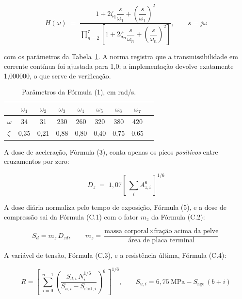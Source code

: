 \documentclass[11pt,a4paper]{article}
\begin{document}
\begin{equation}
H(\omega) \;=\;
\frac{1 + 2\zeta_1 \dfrac{s}{\omega_1} + \left(\dfrac{s}{\omega_1}\right)^2}
     {\displaystyle\prod_{n=2}^{7}
      \left[1 + 2\zeta_n \dfrac{s}{\omega_n} + \left(\dfrac{s}{\omega_n}\right)^2\right]},
\qquad s = j\omega
\label{eq:c5tf}
\end{equation}

\noindent
com os parâmetros da Tabela~\ref{tab:poles}. A norma registra que a
transmissibilidade em corrente contínua foi ajustada para 1,0; a implementação
devolve exatamente 1,000000, o que serve de verificação.

\begin{table}[h]
\centering
\caption{Parâmetros da Fórmula (1), em rad/s.}
\label{tab:poles}
\begin{tabular}{lcccccccc}
\toprule
 & $\omega_1$ & $\omega_2$ & $\omega_3$ & $\omega_4$ & $\omega_5$ & $\omega_6$ & $\omega_7$ \\
\midrule
$\omega$ & 34 & 31 & 230 & 260 & 320 & 380 & 420 \\
$\zeta$  & 0,35 & 0,21 & 0,88 & 0,80 & 0,40 & 0,75 & 0,65 \\
\bottomrule
\end{tabular}
\end{table}

A dose de aceleração, Fórmula (3), conta apenas os picos \emph{positivos} entre
cruzamentos por zero:

\begin{equation}
D_z \;=\; 1{,}07 \left[\ \sum_i A_{z,i}^{6}\ \right]^{1/6}
\label{eq:dz}
\end{equation}

A dose diária normaliza pelo tempo de exposição, Fórmula (5), e a dose de
compressão sai da Fórmula (C.1) com o fator $m_z$ da Fórmula (C.2):

\begin{equation}
S_d = m_z\,D_{zd},
\qquad
m_z = \frac{\text{massa corporal} \times \text{fração acima da pelve}}
           {\text{área de placa terminal}}
\label{eq:mz}
\end{equation}

A variável de tensão, Fórmula (C.3), e a resistência última, Fórmula (C.4):

\begin{equation}
R = \left[\ \sum_{i=0}^{n-1}
    \left(\frac{S_{d,i}\,N_i^{1/6}}{S_{u,i} - S_{\mathrm{stat},i}}\right)^{6}
    \ \right]^{1/6},
\qquad
S_{u,i} = 6{,}75\ \mathrm{MPa} - S_{\mathrm{age}}\,(b+i)
\label{eq:c3}
\end{equation}
\end{document}
